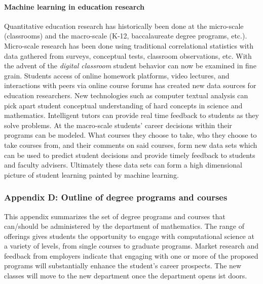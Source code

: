 \documentclass[]{article}
\let\oldparagraph\paragraph
\renewcommand{\paragraph}[1]{\oldparagraph{#1}\mbox{}}
\begin{document}
\hypertarget{machine-learning-in-education-research}{%
\paragraph{Machine learning in education
research}\label{machine-learning-in-education-research}}

Quantitative education research has historically been done at the
micro-scale (classrooms) and the macro-scale (K-12, baccalaureate degree
programs, etc.). Micro-scale research has been done using traditional
correlational statistics with data gathered from surveys, conceptual
tests, classroom observations, etc. With the advent of the \emph{digital
classroom} student behavior can now be examined in fine grain. Students
access of online homework platforms, video lectures, and interactions
with peers via online course forums has created new data sources for
education researchers. New technologies such as computer textual
analysis can pick apart student conceptual understanding of hard
concepts in science and mathematics. Intelligent tutors can provide real
time feedback to students as they solve problems. At the macro-scale
students' career decisions within their programs can be modeled. What
courses they choose to take, who they choose to take courses from, and
their comments on said courses, form new data sets which can be used to
predict student decisions and provide timely feedback to students and
faculty advisers. Ultimately these data sets can form a high dimensional
picture of student learning painted by machine learning.

\hypertarget{appendix-d-outline-of-degree-programs-and-courses}{%
\subsubsection{Appendix D: Outline of degree programs and
courses}\label{appendix-d-outline-of-degree-programs-and-courses}}

This appendix summarizes the set of degree programs and courses that
can/should be administered by the department of mathematics. The range
of offerings gives students the opportunity to engage with computational
science at a variety of levels, from single courses to graduate
programs. Market research and feedback from employers indicate that
engaging with one or more of the proposed programs will substantially
enhance the student's career prospects. The new classes will move to the
new department once the department opens ist doors.
\end{document}
